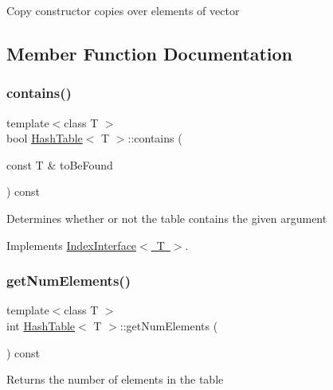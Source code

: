 Copy constructor copies over elements of vector 

\subsection{Member Function Documentation}
\mbox{\label{classHashTable_ae30d145ec5047b093d27b7b7038a45fa}} 
\subsubsection{\texorpdfstring{contains()}{contains()}}
{\footnotesize\ttfamily template$<$class T $>$ \\
bool \mbox{\hyperlink{classHashTable}{Hash\+Table}}$<$ T $>$\+::contains (\begin{DoxyParamCaption}\item[{const T \&}]{to\+Be\+Found }\end{DoxyParamCaption}) const\hspace{0.3cm}{\ttfamily [virtual]}}

Determines whether or not the table contains the given argument 

Implements \mbox{\hyperlink{classIndexInterface}{Index\+Interface$<$ T $>$}}.

\mbox{\label{classHashTable_a8b8869f3dc1b79fd2c4fb6488a44926c}} 
\subsubsection{\texorpdfstring{get\+Num\+Elements()}{getNumElements()}}
{\footnotesize\ttfamily template$<$class T $>$ \\
int \mbox{\hyperlink{classHashTable}{Hash\+Table}}$<$ T $>$\+::get\+Num\+Elements (\begin{DoxyParamCaption}{ }\end{DoxyParamCaption}) const}

Returns the number of elements in the table \mbox{\label{classHashTable_a1da70d706b97754c2bd359d2f512b087}} 
